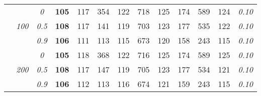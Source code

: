 \begin{table}
\begin{center}
\begin{tabular}{ccc|cc|cc|cc|cc|c|c}
\cline{2-3}\rule{0pt}{3ex}
& & \it  0  & {\bf 105} & 117 & 354 & 122 & 718 & 125 & 174 & 589 & 124 & \it  0.10 \\
 & \it  100  & \it  0.5  & {\bf 108} & 117 & 141 & 119 & 703 & 123 & 177 & 535 & 122 & \it  0.10 \\
& & \it  0.9  & {\bf 106} & 111 & 113 & 115 & 673 & 120 & 158 & 243 & 115 & \it  0.10 \\[1ex]
\cline{2-3}\rule{0pt}{3ex}
& & \it  0  & {\bf 105} & 118 & 368 & 122 & 716 & 125 & 174 & 589 & 125 & \it  0.10 \\
 & \it  200  & \it  0.5  & {\bf 108} & 117 & 147 & 119 & 705 & 123 & 177 & 534 & 121 & \it  0.10 \\
& & \it  0.9  & {\bf 106} & 112 & 113 & 116 & 674 & 121 & 159 & 243 & 115 & \it  0.10 \\
\hline\end{tabular}
\end{center}
\end{table}




